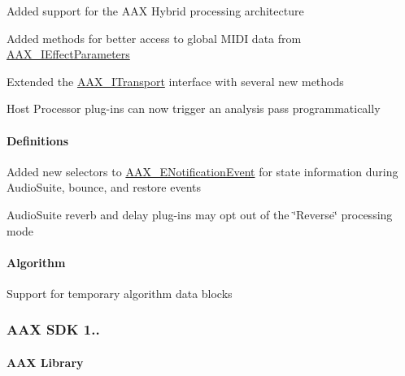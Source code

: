 \begin{DoxyItemize}
\item Added support for the A\+A\+X Hybrid processing architecture 
\item Added methods for better access to global M\+I\+D\+I data from \hyperlink{a00099}{A\+A\+X\+\_\+\+I\+Effect\+Parameters}  
\item Extended the \hyperlink{a00116}{A\+A\+X\+\_\+\+I\+Transport} interface with several new methods 
\item Host Processor plug-\/ins can now trigger an analysis pass programmatically  
\end{DoxyItemize}\hypertarget{a00375_aax_sdk_2p0p0_Definitions}{}\paragraph{Definitions}\label{a00375_aax_sdk_2p0p0_Definitions}

\begin{DoxyItemize}
\item Added new selectors to \hyperlink{a00206_afab5ea2cfd731fc8f163b6caa685406e}{A\+A\+X\+\_\+\+E\+Notification\+Event} for state information during Audio\+Suite, bounce, and restore events  
\item Audio\+Suite reverb and delay plug-\/ins may opt out of the \char`\"{}\+Reverse\char`\"{} processing mode 
\end{DoxyItemize}\hypertarget{a00375_aax_sdk_2p0p0_Algorithm}{}\paragraph{Algorithm}\label{a00375_aax_sdk_2p0p0_Algorithm}

\begin{DoxyItemize}
\item Support for temporary algorithm data blocks 
\end{DoxyItemize}\hypertarget{a00375_aax_sdk_1p5p0}{}\subsubsection{A\+A\+X S\+D\+K 1..}\label{a00375_aax_sdk_1p5p0}
\hypertarget{a00375_aax_sdk_1p5p0_AAXLibrary}{}\paragraph{A\+A\+X Library}\label{a00375_aax_sdk_1p5p0_AAXLibrary}

